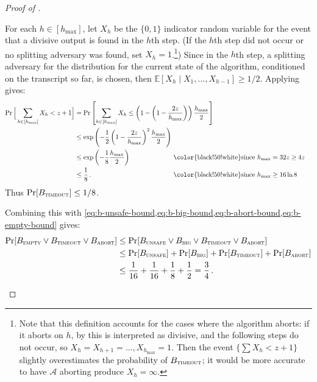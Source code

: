 \documentclass[10pt,a4paper]{article}
\theoremstyle{definition}
\theoremstyle{remark}
\newcommand{\EE}{\mathbb{E}}
\newcommand{\cA}{\mathcal{A}}
\newcommand{\unsafesc}{\textsc{unsafe}\xspace}
\newcommand{\emptysc}{\textsc{empty}\xspace}
\newcommand{\timeoutsc}{\textsc{timeout}\xspace}
\newcommand{\bigsc}{\textsc{big}\xspace}
\newcommand{\abortsc}{\textsc{abort}\xspace}
\begin{document}
\begin{itemize}
\begin{itemize}
\begin{proof}[Proof of ]
\begin{itemize}
\begin{itemize}[wide, font=\bfseries]
    For each $h \in [h_{\max}]$, let $X_h$ be the $\{0,1\}$ indicator random
    variable for the event that a divisive output is found in the $h$th step.
    (If the $h$th step did not occur or no splitting adversary was found, set
    $X_h = 1$.\footnote{Note that this definition accounts for the cases where the
    algorithm aborts: if it aborts on $h$, by  this is interpreted
    as divisive, and the following steps do not occur, so $X_h=X_{h+1}=\ldots,X_{h_{\max}}=1$.
    Then the event $\{\sum X_h < z+1\}$ slightly overestimates the probability
    of $B_{\timeoutsc}$; it would be more accurate to have $\cA$ aborting produce 
    $X_h = \infty$.}) Since in the $h$th step, a splitting adversary for the
    distribution for the current state of the algorithm, conditioned on the
    transcript so far, is chosen, then $\EE[X_h \mid X_1,\ldots,X_{h-1}] \ge
    1/2$.
    Applying  gives:
    \begin{align*}
      \Pr\Big[\sum_{h \in [h_{\max}]} X_h < z + 1\Big] &= \Pr\left[\sum_{h \in [h_{\max}]} X_h \le \left(1 - \left(1-\frac{2 z}{h_{\max}} \right) \right)\frac{h_{\max}}{2} \right]\\
        &\le \exp\left( - \frac{1}{2} \left(1-\frac{2 z}{h_{\max}} \right)^2 \frac{h_{\max}}{2}\right) \\
        &\le \exp\left( - \frac{1}{8} \frac{h_{\max}}{2}\right) &&\hspace{-2.5cm}\text{\color{black!50!white}since $h_{\max} = 32 z \ge 4 z$} \\
        &\le \frac{1}{8} \,. &&\hspace{-2.5cm}\text{\color{black!50!white}since $h_{\max} \ge 16 \ln 8$}
    \end{align*}
    Thus $\Pr[B_{\timeoutsc}] \le 1/8$.

    Combining this  with \cref{eq:b-unsafe-bound,eq:b-big-bound,eq:b-abort-bound,eq:b-empty-bound} gives:
    \begin{align}
      \Pr[B_{\emptysc} \lor B_{\timeoutsc} \lor B_{\abortsc}]
        &\le \Pr[B_{\unsafesc} \lor B_{\bigsc} \lor B_{\timeoutsc} \lor B_{\abortsc}] \nonumber\\
        &\le \Pr[B_{\unsafesc}] + \Pr[B_{\bigsc}] + \Pr[B_{\timeoutsc}] + \Pr[B_{\abortsc}] \nonumber\\
        &\le \frac{1}{16} + \frac{1}{16} + \frac{1}{8} + \frac{1}{2} = \frac{3}{4} \,.\label{eq:unsafe-big-fail-abort-bound}
    \end{align}
  

\end{itemize}
\end{itemize}
\end{proof}
\end{itemize}
\end{itemize}
\end{document}
